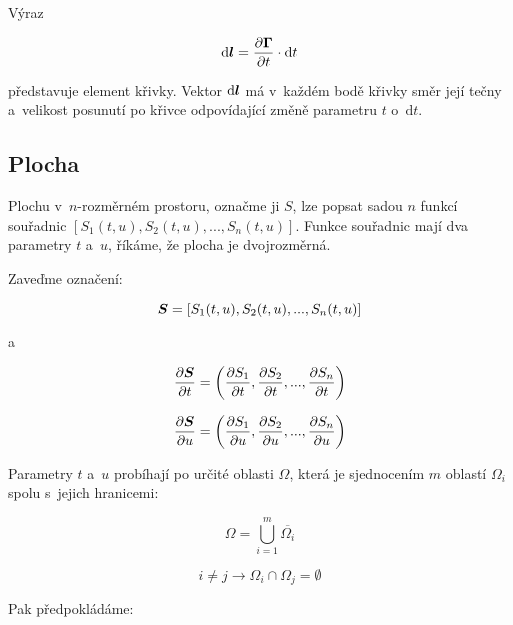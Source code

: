 Výraz 

\begin{equation}
\mathrm{d}\boldsymbol{l} = \frac{\partial \boldsymbol{\Gamma}}{\partial t} \cdot \mathrm{d}t 
\end{equation}

představuje element křivky. Vektor \(\mathrm{d}\boldsymbol{l}\) má v~každém bodě křivky směr její tečny a~velikost posunutí po křivce odpovídající změně parametru \(t\) o~\(\mathrm{d}t\).

\subsection{Plocha}

Plochu v~\(n\)-rozměrném prostoru, označme ji \(S\), lze popsat sadou \(n\) funkcí souřadnic \([S_1(t, u), S_2(t, u), ..., S_n(t, u)]\). Funkce souřadnic mají dva parametry \(t\) a~\(u\), říkáme, že plocha je dvojrozměrná.

Zaveďme označení:

\begin{equation}
\boldsymbol{S} = [S_1(t, u), S_2(t, u), ..., S_n(t, u)]
\end{equation}

a

\begin{equation}
\frac{\partial \boldsymbol{S}}{\partial t} = \left(\frac{\partial S_1}{\partial t}, \frac{\partial S_2}{\partial t}, ..., \frac{\partial S_n}{\partial t} \right)
\end{equation}

\begin{equation}
\frac{\partial \boldsymbol{S}}{\partial u} = \left(\frac{\partial S_1}{\partial u}, \frac{\partial S_2}{\partial u}, ..., \frac{\partial S_n}{\partial u} \right)
\end{equation}

Parametry \(t\) a~\(u\) probíhají po určité oblasti \(\Omega\), která je sjednocením \(m\) oblastí \(\Omega_i\) spolu s~jejich hranicemi:

\begin{equation}
\Omega = \bigcup_{i=1}^m \overline{\Omega_i}
\end{equation}

\begin{equation}
i \neq j \rightarrow \Omega_i \cap \Omega_j = \emptyset
\end{equation}

Pak předpokládáme:

